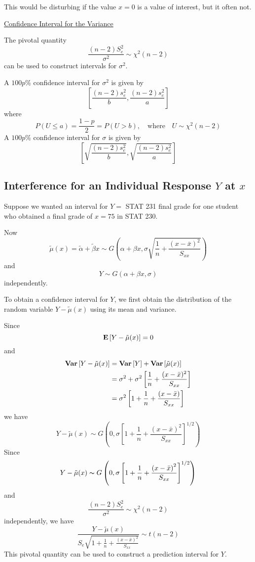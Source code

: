 This would be disturbing if the value $ x=0 $ is a value of interest, but it often not.

\underline{Confidence Interval for the Variance}

The pivotal quantity
\[ \frac{(n-2)S_e^2}{\sigma^2}\sim \chi^2(n-2)  \]
can be used to construct intervals for $ \sigma^2 $.

A $ 100p\% $ confidence interval for $ \sigma^2 $ is given by
\[ \left[ \frac{(n-2)s_e^2}{b} , \frac{(n-2)s_e^2}{a}  \right] \]
where
\[ P(U\leqslant a)=\frac{1-p}{2}=P(U>b),\quad\text{where}\quad U\sim \chi^2(n-2) \]
A $ 100p\% $ confidence interval for $ \sigma $ is given by
\[ \left[ \sqrt{\frac{(n-2)s_e^2}{b}} , \sqrt{\frac{(n-2)s_e^2}{a}}  \right] \]

\subsection{Interference for an Individual Response $ Y $ at $ x $}
Suppose we wanted an interval for $ Y= $ STAT 231 final grade for one student
who obtained a final grade of $ x=75 $ in STAT 230.

Now
\[\tilde{\mu}(x)=\tilde{\alpha}+\tilde{\beta} x \sim G\left(\alpha+\beta x,
    \sigma \sqrt{\frac{1}{n}+\frac{(x-\bar{x})^{2}}{S_{x x}}}\right)\]
and
\[ Y \sim G(\alpha+\beta x, \sigma) \]
independently.

To obtain a confidence interval for $ Y $, we first obtain the distribution
of the random variable $ Y-\tilde{\mu}(x) $ using its mean and variance.

Since
\[ \bm{\mathrm{E}}\left[Y-\tilde{\mu}(x)\right]=0 \]
and
\begin{align*}
    \bm{\mathrm{Var}}\left[Y-\tilde{\mu}(x)\right]
     & =\bm{\mathrm{Var}}\left[Y\right]+\bm{\mathrm{Var}}\left[\tilde{\mu}(x)\right]                                                    \\
     & =\sigma^2+\sigma^2\left[ \frac{1}{n} +\frac{(x-\bar{x})^2}{S_{xx}}  \right]      \\
     & =\sigma^2\left[ 1+\frac{1}{n} + \frac{\left( x-\bar{x} \right)}{S_{xx}}  \right]
\end{align*}
we have
\[ Y-\tilde{\mu}(x)\sim G\left( 0,\sigma\left[ 1+\frac{1}{n} + \frac{\left( x-\bar{x} \right)^2}{S_{xx}}  \right]
    ^{1/2} \right) \]
Since
\[ Y-\tilde{\mu}(x)\thicksim G\left( 0,\sigma\left[ 1+\frac{1}{n} + \frac{\left( x-\bar{x} \right)^2}{S_{xx}}  \right]
    ^{1/2} \right) \]
and
\[ \frac{(n-2)S_e^2}{\sigma^2}\sim \chi^2(n-2)  \]
independently, we have
\[ \frac{Y-\tilde{\mu}(x)}{S_{e} \sqrt{1+\frac{1}{n}+\frac{(x-\bar{x})^{2}}{S_{x x}}}} \sim t(n-2) \]
This pivotal quantity can be used to construct a prediction interval for $ Y $.

